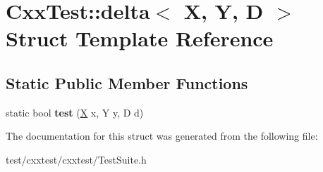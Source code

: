 \hypertarget{structCxxTest_1_1delta}{\section{Cxx\-Test\-:\-:delta$<$ X, Y, D $>$ Struct Template Reference}
\label{structCxxTest_1_1delta}
}
\subsection*{Static Public Member Functions}
\begin{DoxyCompactItemize}
\item 
\hypertarget{structCxxTest_1_1delta_a3f7dd60392ed284232cd0f522486cc9b}{static bool {\bfseries test} (\hyperlink{classX}{X} x, Y y, D d)}\label{structCxxTest_1_1delta_a3f7dd60392ed284232cd0f522486cc9b}

\end{DoxyCompactItemize}


The documentation for this struct was generated from the following file\-:\begin{DoxyCompactItemize}
\item 
test/cxxtest/cxxtest/Test\-Suite.\-h\end{DoxyCompactItemize}
